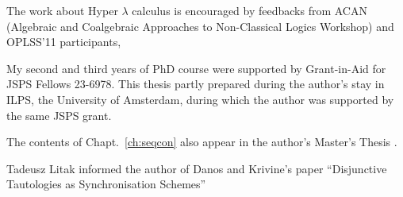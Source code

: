 \begin{acknowledge}
The work about Hyper $\lambda$ calculus is encouraged by feedbacks from
ACAN (Algebraic and
Coalgebraic
Approaches to
Non-Classical Logics Workshop) and OPLSS'11 participants,

My second and third years of PhD course were
supported by Grant-in-Aid for JSPS Fellows 23-6978.
This thesis partly prepared during the author's stay in
ILPS, the University of Amsterdam, during which the author was supported
 by the same JSPS grant.

The contents of Chapt.~\ref{ch:seqcon} also appear in the author's Master's Thesis
 .

 Tadeusz Litak informed the author of Danos and Krivine's paper
 ``Disjunctive Tautologies as Synchronisation Schemes''
\end{acknowledge}

